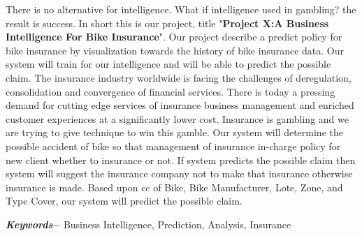 There is no alternative for intelligence. What if intelligence used in gambling? the result is success. In short this is our project, title "\textbf{Project X:A Business Intelligence For Bike Insurance}". Our project describe a predict policy for bike insurance by visualization towards the history of bike insurance data. Our system will train for our intelligence and will be able to predict the possible claim. The insurance industry worldwide is facing the challenges of deregulation, consolidation and convergence of financial services. There is today a pressing demand for cutting edge services of insurance business management and enriched customer experiences at a significantly lower cost. Insurance is gambling and we are trying to give technique to win this gamble. Our system will determine the possible accident of bike so that management of insurance in-charge policy for new client whether to insurance or not. If system predicts the possible claim then system will suggest the insurance company not to make that insurance otherwise insurance is made. Based upon \acs{cc} of Bike, Bike Manufacturer, Lote, Zone, and Type Cover, our system will predict the possible claim.
\par
\textbf{\textit{Keywords$-$}} Business Intelligence, Prediction, Analysis, Insurance 


